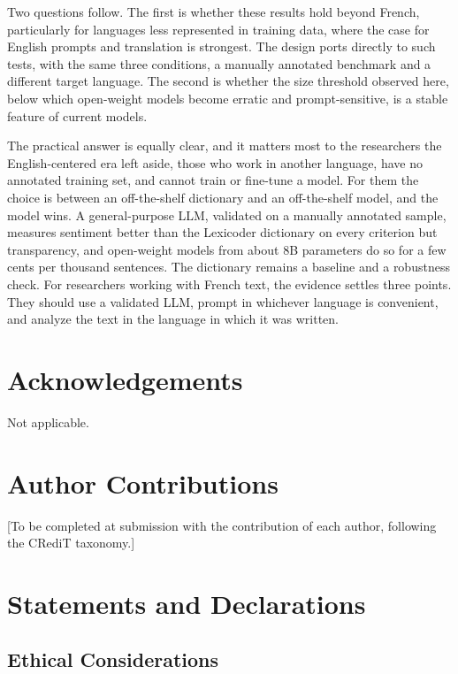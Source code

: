 \documentclass[
  man,
  floatsintext,
  longtable,
  nolmodern,
  notxfonts,
  notimes,
  colorlinks=true,linkcolor=blue,citecolor=blue,urlcolor=blue]{apa7}
\begin{document}
Two questions follow. The first is whether these results hold beyond
French, particularly for languages less represented in training data,
where the case for English prompts and translation is strongest. The
design ports directly to such tests, with the same three conditions, a
manually annotated benchmark and a different target language. The second
is whether the size threshold observed here, below which open-weight
models become erratic and prompt-sensitive, is a stable feature of
current models.

The practical answer is equally clear, and it matters most to the
researchers the English-centered era left aside, those who work in
another language, have no annotated training set, and cannot train or
fine-tune a model. For them the choice is between an off-the-shelf
dictionary and an off-the-shelf model, and the model wins. A
general-purpose LLM, validated on a manually annotated sample, measures
sentiment better than the Lexicoder dictionary on every criterion but
transparency, and open-weight models from about 8B parameters do so for
a few cents per thousand sentences. The dictionary remains a baseline
and a robustness check. For researchers working with French text, the
evidence settles three points. They should use a validated LLM, prompt
in whichever language is convenient, and analyze the text in the
language in which it was written.

\section*{Acknowledgements}\label{acknowledgements}

Not applicable.

\section*{Author Contributions}\label{author-contributions}

{[}To be completed at submission with the contribution of each author,
following the CRediT taxonomy.{]}

\section*{Statements and
Declarations}\label{statements-and-declarations}

\subsection*{Ethical Considerations}\label{ethical-considerations}
\end{document}
